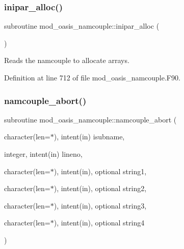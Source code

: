 \mbox{\label{namespacemod__oasis__namcouple_acb43892c17b5f8c8b360effb5a811c27}} 
\subsubsection{\texorpdfstring{inipar\+\_\+alloc()}{inipar\_alloc()}}
{\footnotesize\ttfamily subroutine mod\+\_\+oasis\+\_\+namcouple\+::inipar\+\_\+alloc (\begin{DoxyParamCaption}{ }\end{DoxyParamCaption})\hspace{0.3cm}{\ttfamily [private]}}



Reads the namcouple to allocate arrays. 



Definition at line 712 of file mod\+\_\+oasis\+\_\+namcouple.\+F90.

\mbox{\label{namespacemod__oasis__namcouple_aefebb1d6fd8ac62ea91f9e03265440a3}} 
\subsubsection{\texorpdfstring{namcouple\+\_\+abort()}{namcouple\_abort()}}
{\footnotesize\ttfamily subroutine mod\+\_\+oasis\+\_\+namcouple\+::namcouple\+\_\+abort (\begin{DoxyParamCaption}\item[{character(len=$\ast$), intent(in)}]{isubname,  }\item[{integer, intent(in)}]{lineno,  }\item[{character(len=$\ast$), intent(in), optional}]{string1,  }\item[{character(len=$\ast$), intent(in), optional}]{string2,  }\item[{character(len=$\ast$), intent(in), optional}]{string3,  }\item[{character(len=$\ast$), intent(in), optional}]{string4 }\end{DoxyParamCaption})\hspace{0.3cm}{\ttfamily [private]}}



